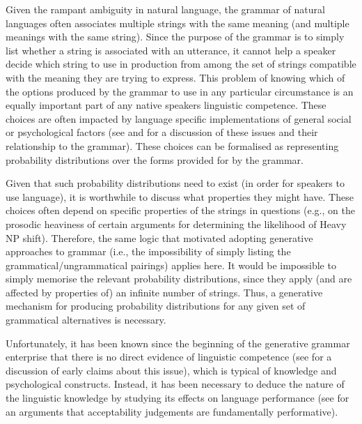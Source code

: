 Given the rampant ambiguity in natural language, the grammar of natural languages often associates multiple strings with the same meaning (and multiple meanings with the same string). Since the purpose of the grammar is to simply list whether a string is associated with an utterance, it cannot help a speaker decide which string to use in production from among the set of strings compatible with the meaning they are trying to express. This problem of knowing which of the options produced by the grammar to use in any particular circumstance is an equally important part of any native speakers linguistic competence. These choices are often impacted by language specific implementations of general social or psychological factors (see \cite{Bresnan.2007,Bresnan.2010,Zeevat.2014} and \cite{Tamminga.2016} for a discussion of these issues and their relationship to the grammar). These choices can be formalised as representing probability distributions over the forms provided for by the grammar.

Given that such probability distributions need to exist (in order for speakers to use language), it is worthwhile to discuss what properties they might have. These choices often depend on specific properties of the strings in questions (e.g., on the prosodic heaviness of certain arguments for determining the likelihood of Heavy NP shift). Therefore, the same logic that motivated adopting generative approaches to grammar (i.e., the impossibility of simply listing the grammatical/ungrammatical pairings) applies here. It would be impossible to simply memorise the relevant probability distributions, since they apply (and are affected by properties of) an infinite number of strings. Thus, a generative mechanism for producing probability distributions for any given set of grammatical alternatives is necessary.

Unfortunately, it has been known since the beginning of the generative grammar enterprise that there is no direct evidence of linguistic competence (see \cite{Schutze.1996} for a discussion of early claims about this issue), which is typical of knowledge and psychological constructs. Instead, it has been necessary to deduce the nature of the linguistic knowledge by studying its effects on language performance (see \citealt{Stroud.2012,Phillips.2013, Phillips.2013b, Phillips.2013c} for an arguments that acceptability judgements are fundamentally performative).

